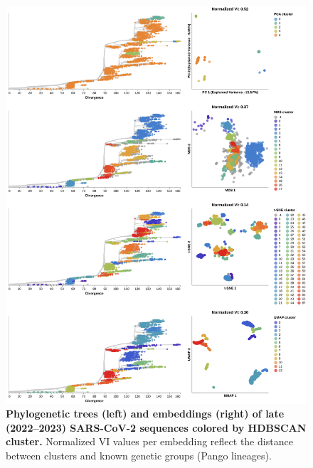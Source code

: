 \begin{figure}[!h]
\includegraphics[width=\columnwidth]{figures/sarscov2-test-embeddings-by-cluster-vs-Nextclade_pango_collapsed.png}
\caption{{\bf Phylogenetic trees (left) and embeddings (right) of late (2022--2023) SARS-CoV-2 sequences colored by HDBSCAN cluster.}
  Normalized VI values per embedding reflect the distance between clusters and known genetic groups (Pango lineages).
}\label{S_Fig_sarscov2_late_embeddings_by_cluster_vs_Nextclade_pango}
\end{figure}

